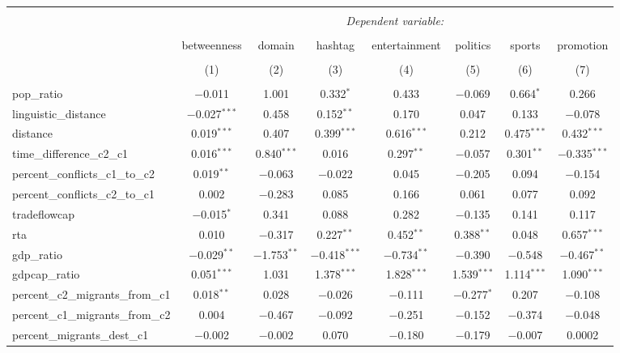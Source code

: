 
\begin{table}[!htbp] \centering 
  \caption{} 
  \label{} 
\begin{tabular}{@{\extracolsep{5pt}}lccccccc} 
\\[-1.8ex]\hline 
\hline \\[-1.8ex] 
 & \multicolumn{7}{c}{\textit{Dependent variable:}} \\ 
\cline{2-8} 
\\[-1.8ex] & betweenness & domain & hashtag & entertainment & politics & sports & promotion \\ 
\\[-1.8ex] & (1) & (2) & (3) & (4) & (5) & (6) & (7)\\ 
\hline \\[-1.8ex] 
 pop\_ratio & $-$0.011 & 1.001 & 0.332$^{*}$ & 0.433 & $-$0.069 & 0.664$^{*}$ & 0.266 \\ 
  linguistic\_distance & $-$0.027$^{***}$ & 0.458 & 0.152$^{**}$ & 0.170 & 0.047 & 0.133 & $-$0.078 \\ 
  distance & 0.019$^{***}$ & 0.407 & 0.399$^{***}$ & 0.616$^{***}$ & 0.212 & 0.475$^{***}$ & 0.432$^{***}$ \\ 
  time\_difference\_c2\_c1 & 0.016$^{***}$ & 0.840$^{***}$ & 0.016 & 0.297$^{**}$ & $-$0.057 & 0.301$^{**}$ & $-$0.335$^{***}$ \\ 
  percent\_conflicts\_c1\_to\_c2 & 0.019$^{**}$ & $-$0.063 & $-$0.022 & 0.045 & $-$0.205 & 0.094 & $-$0.154 \\ 
  percent\_conflicts\_c2\_to\_c1 & 0.002 & $-$0.283 & 0.085 & 0.166 & 0.061 & 0.077 & 0.092 \\ 
  tradeflowcap & $-$0.015$^{*}$ & 0.341 & 0.088 & 0.282 & $-$0.135 & 0.141 & 0.117 \\ 
  rta & 0.010 & $-$0.317 & 0.227$^{**}$ & 0.452$^{**}$ & 0.388$^{**}$ & 0.048 & 0.657$^{***}$ \\ 
  gdp\_ratio & $-$0.029$^{**}$ & $-$1.753$^{**}$ & $-$0.418$^{***}$ & $-$0.734$^{**}$ & $-$0.390 & $-$0.548 & $-$0.467$^{**}$ \\ 
  gdpcap\_ratio & 0.051$^{***}$ & 1.031 & 1.378$^{***}$ & 1.828$^{***}$ & 1.539$^{***}$ & 1.114$^{***}$ & 1.090$^{***}$ \\ 
  percent\_c2\_migrants\_from\_c1 & 0.018$^{**}$ & 0.028 & $-$0.026 & $-$0.111 & $-$0.277$^{*}$ & 0.207 & $-$0.108 \\ 
  percent\_c1\_migrants\_from\_c2 & 0.004 & $-$0.467 & $-$0.092 & $-$0.251 & $-$0.152 & $-$0.374 & $-$0.048 \\ 
  percent\_migrants\_dest\_c1 & $-$0.002 & $-$0.002 & 0.070 & $-$0.180 & $-$0.179 & $-$0.007 & 0.0002 \\ 

\end{tabular}
\end{table}
